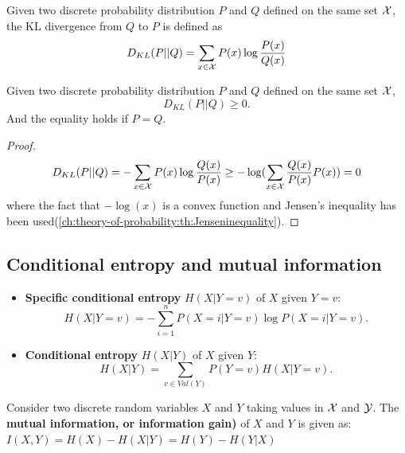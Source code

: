 \begin{refsection}
\begin{definition}
	Given two discrete probability distribution $P$ and $Q$ defined on the same set $\mathcal{X}$, the KL divergence from $Q$ to $P$ is defined as
	$$D_{KL}(P||Q) = \sum_{x\in\mathcal{X}} P(x)\log \frac{P(x)}{Q(x)}$$ 
\end{definition}

\begin{lemma}
	Given two discrete probability distribution $P$ and $Q$ defined on the same set $\mathcal{X}$,
	$$D_{KL}(P||Q)\geq 0.$$
	And the equality holds if $P=Q$.
\end{lemma}
\begin{proof}
	$$D_{KL}(P||Q) = -\sum_{x\in\mathcal{X}} P(x)\log \frac{Q(x)}{P(x)}\geq - \log (\sum_{x\in\mathcal{X}} \frac{Q(x)}{P(x)} P(x)) = 0$$
	where the fact that $-\log(x)$ is a convex function and Jensen's inequality has been used(\autoref{ch:theory-of-probability:th:Jenseninequality}).
\end{proof}

\subsection{Conditional entropy and mutual information}


\begin{definition}\hfill
	\begin{itemize}
		\item \textbf{Specific conditional entropy} $H(X|Y=v)$ of $X$ given $Y=v$:
		$$H(X|Y=v) = - \sum_{i=1}^n P(X=i|Y=v)\log P(X=i|Y=v).$$
		\item \textbf{Conditional entropy} $H(X|Y)$ of $X$ given $Y$:
		$$H(X|Y) = \sum_{v\in Val(Y)}P(Y=v)H(X|Y=v).$$
	\end{itemize}
\end{definition}


\begin{definition}\cite{cover2012elements}
	Consider two discrete random variables $X$ and $Y$ taking values in $\mathcal{X}$ and $\mathcal{Y}$. The \textbf{mutual information, or information gain)} of $X$ and $Y$ is given as:
	$I(X,Y) = H(X) - H(X|Y) = H(Y) - H(Y|X)$
\end{definition}


\end{refsection}
